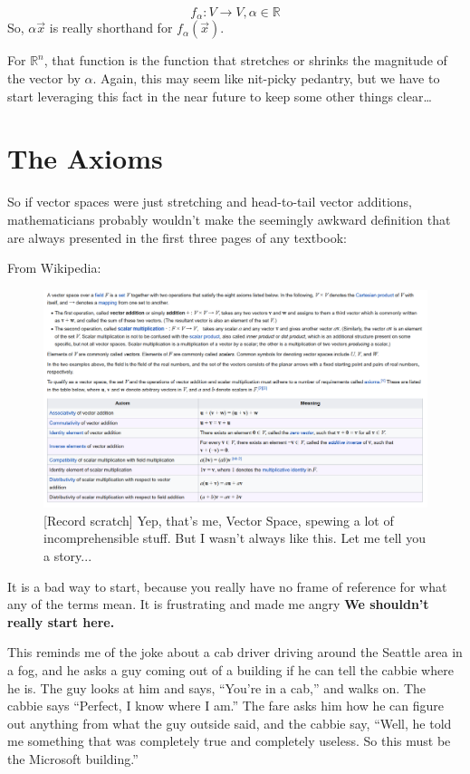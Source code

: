 \documentclass[
]{book}
\begin{document}
\[ f_{\alpha} : V \to V , \alpha \in \mathbb{R} \]
So, \(\alpha \vec{x}\) is really shorthand for \(f_{\alpha}(\vec{x})\).

For \(\mathbb{R}^n\), that function is the function that stretches or shrinks the magnitude of the vector by \(\alpha\). Again, this may seem like nit-picky pedantry, but we have to start leveraging this fact in the near future to keep some other things clear\ldots{}

\hypertarget{the-axioms}{%
\section{The Axioms}\label{the-axioms}}

So if vector spaces were just stretching and head-to-tail vector additions, mathematicians probably wouldn't make the seemingly awkward definition that are always presented in the first three pages of any textbook:

From Wikipedia:

\begin{figure}

{\centering \includegraphics[width=1\linewidth,height=1\textheight]{images/vector-space-axioms-wikipedia_2} 

}

\caption{[Record scratch]  Yep, that's me, Vector Space, spewing a lot of incomprehensible stuff.  But I wasn't always like this.  Let me tell you a story...}\label{fig:unnamed-chunk-3}
\end{figure}

It is a bad way to start, because you really have no frame of reference for what any of the terms mean. It is frustrating and made me angry \textbf{We shouldn't really start here.}

This reminds me of the joke about a cab driver driving around the Seattle area in a fog, and he asks a guy coming out of a building if he can tell the cabbie where he is. The guy looks at him and says, ``You're in a cab,'' and walks on. The cabbie says ``Perfect, I know where I am.'' The fare asks him how he can figure out anything from what the guy outside said, and the cabbie say, ``Well, he told me something that was completely true and completely useless. So this must be the Microsoft building.''
\end{document}
